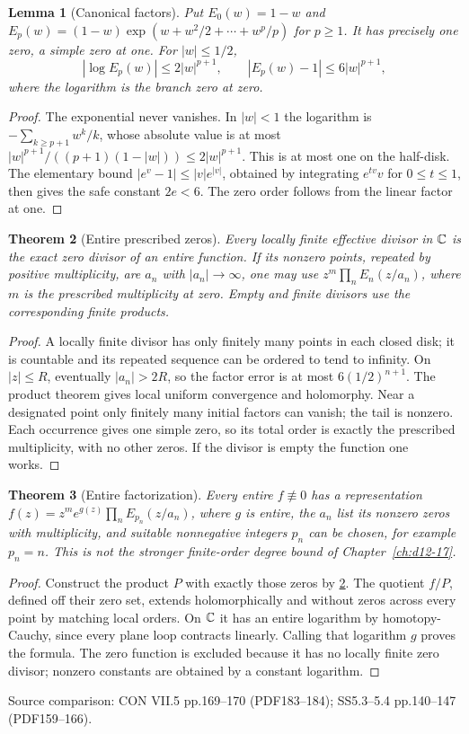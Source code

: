 \documentclass[11pt,a4paper,openany]{book}
\newtheorem{theorem}{Theorem}[chapter]
\newtheorem{lemma}[theorem]{Lemma}
\theoremstyle{definition}
\theoremstyle{remark}\newtheorem{remark}[theorem]{Remark}
\newcommand{\family}[1]{}
\newcommand{\source}[1]{\par\begingroup\small\sffamily\color{black!65}Source comparison: #1\par\endgroup}
\begin{document}
\begin{lemma}[Canonical factors]\family{D12.16.02}\label{d12:16-02}
Put $E_0(w)=1-w$ and $E_p(w)=(1-w)\exp(w+w^2/2+\cdots+w^p/p)$ for $p\ge1$. It has precisely one zero, a simple zero at one. For $|w|\le1/2$,
\[
 |\log E_p(w)|\le2|w|^{p+1},\qquad
 |E_p(w)-1|\le6|w|^{p+1},
\]
where the logarithm is the branch zero at zero.
\end{lemma}
\begin{proof}
The exponential never vanishes. In $|w|<1$ the logarithm is $-\sum_{k\ge p+1}w^k/k$, whose absolute value is at most $|w|^{p+1}/((p+1)(1-|w|))\le2|w|^{p+1}$. This is at most one on the half-disk. The elementary bound $|e^v-1|\le |v|e^{|v|}$, obtained by integrating $e^{tv}v$ for $0\le t\le1$, then gives the safe constant $2e<6$. The zero order follows from the linear factor at one.
\end{proof}

\begin{theorem}[Entire prescribed zeros]\family{D12.16.03}\label{d12:16-03}
Every locally finite effective divisor in $\mathbb C$ is the exact zero divisor of an entire function. If its nonzero points, repeated by positive multiplicity, are $a_n$ with $|a_n|\to\infty$, one may use
$z^m\prod_n E_n(z/a_n)$, where $m$ is the prescribed multiplicity at zero. Empty and finite divisors use the corresponding finite products.
\end{theorem}
\begin{proof}
A locally finite divisor has only finitely many points in each closed disk; it is countable and its repeated sequence can be ordered to tend to infinity. On $|z|\le R$, eventually $|a_n|>2R$, so the factor error is at most $6(1/2)^{n+1}$. The product theorem gives local uniform convergence and holomorphy. Near a designated point only finitely many initial factors can vanish; the tail is nonzero. Each occurrence gives one simple zero, so its total order is exactly the prescribed multiplicity, with no other zeros. If the divisor is empty the function one works.
\end{proof}

\begin{theorem}[Entire factorization]\family{D12.16.04}\label{d12:16-04}
Every entire $f\not\equiv0$ has a representation
$f(z)=z^m e^{g(z)}\prod_n E_{p_n}(z/a_n)$,
where $g$ is entire, the $a_n$ list its nonzero zeros with multiplicity, and suitable nonnegative integers $p_n$ can be chosen, for example $p_n=n$. This is not the stronger finite-order degree bound of Chapter~\ref{ch:d12-17}.
\end{theorem}
\begin{proof}
Construct the product $P$ with exactly those zeros by \cref{d12:16-03}. The quotient $f/P$, defined off their zero set, extends holomorphically and without zeros across every point by matching local orders. On $\mathbb C$ it has an entire logarithm by homotopy-Cauchy, since every plane loop contracts linearly. Calling that logarithm $g$ proves the formula. The zero function is excluded because it has no locally finite zero divisor; nonzero constants are obtained by a constant logarithm.
\end{proof}
\source{CON VII.5 pp.169--170 (PDF183--184); SS5.3--5.4 pp.140--147 (PDF159--166).}
\end{document}
